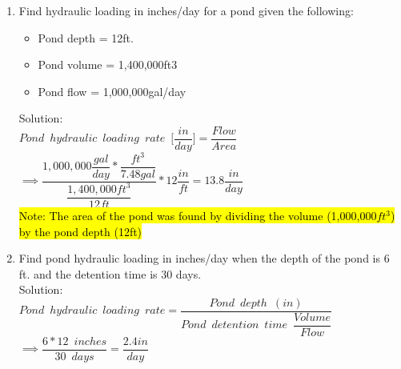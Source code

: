 \begin{enumerate}

\item Find hydraulic loading in inches/day for a pond given the following:
\begin{itemize}
\item Pond depth = 12ft.
\item Pond volume = 1,400,000ft3
\item Pond flow = 1,000,000gal/day
\end{itemize}
Solution:\\
$Pond \enspace hydraulic \enspace loading \enspace rate \enspace \Bigg[\dfrac{in}{day}\Bigg]=\dfrac{Flow}{Area}$\\
$ \implies\dfrac{1,000,000\dfrac{gal}{day}*\dfrac{ft^3 }{7.48gal}}{\dfrac{1,400,000ft^3}{12ft}}*12\dfrac{in}{ft}=\boxed{13.8\dfrac{in}{day}}$\\
\vspace{0.3cm}
\hl{Note:  The area of the pond was found by dividing the volume (1,000,000$ft^3$) by the pond depth (12ft)}
\vspace{0.3cm}

\item Find pond hydraulic loading in inches/day when the depth of the pond is 6 ft. and the detention time is 30 days.\\
Solution:\\



$Pond \enspace hydraulic \enspace loading \enspace rate=\dfrac{Pond \enspace depth \enspace (in)}{Pond \enspace detention  \enspace time \enspace \dfrac{Volume}{Flow}}$\\
$\implies \dfrac{6*12 \enspace inches}{30 \enspace days}=\boxed{\dfrac{2.4in}{day}}$
\end{enumerate}


